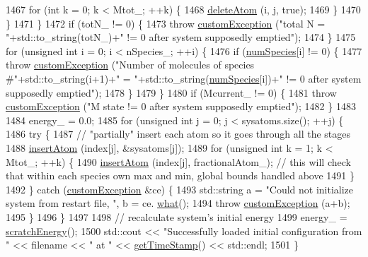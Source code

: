 \begin{DoxyCode}
1467             \textcolor{keywordflow}{for} (\textcolor{keywordtype}{int} k = 0; k < Mtot\_; ++k) \{
1468                 \hyperlink{classsim_system_acabf4fc5b5b90bba62e1449ddb3646c6}{deleteAtom} (i, j, \textcolor{keyword}{true});
1469             \}
1470         \}
1471     \}
1472     \textcolor{keywordflow}{if} (totN\_ != 0) \{
1473         \textcolor{keywordflow}{throw} \hyperlink{classcustom_exception}{customException} (\textcolor{stringliteral}{"total N = "}+std::to\_string(totN\_)+\textcolor{stringliteral}{" != 0 after system
       supposedly emptied"});
1474     \}
1475     \textcolor{keywordflow}{for} (\textcolor{keywordtype}{unsigned} \textcolor{keywordtype}{int} i = 0; i < nSpecies\_; ++i) \{
1476         \textcolor{keywordflow}{if} (\hyperlink{classsim_system_a9eea865e6dc1cff377b1e79c4d9c23f0}{numSpecies}[i] != 0) \{
1477             \textcolor{keywordflow}{throw} \hyperlink{classcustom_exception}{customException} (\textcolor{stringliteral}{"Number of molecules of species #"}+std::to\_string(i+1)+\textcolor{stringliteral}{"
       = "}+std::to\_string(\hyperlink{classsim_system_a9eea865e6dc1cff377b1e79c4d9c23f0}{numSpecies}[i])+\textcolor{stringliteral}{" != 0 after system supposedly emptied"});
1478         \}
1479     \}
1480     \textcolor{keywordflow}{if} (Mcurrent\_ != 0) \{
1481         \textcolor{keywordflow}{throw} \hyperlink{classcustom_exception}{customException} (\textcolor{stringliteral}{"M state != 0 after system supposedly emptied"});
1482     \}
1483 
1484     energy\_ = 0.0;
1485     \textcolor{keywordflow}{for} (\textcolor{keywordtype}{unsigned} \textcolor{keywordtype}{int} j = 0; j < sysatoms.size(); ++j) \{
1486         \textcolor{keywordflow}{try} \{
1487             \textcolor{comment}{// "partially" insert each atom so it goes through all the stages}
1488             \hyperlink{classsim_system_a0404e9435cc046d19b6bb990678ee069}{insertAtom} (index[j], &sysatoms[j]);
1489             \textcolor{keywordflow}{for} (\textcolor{keywordtype}{unsigned} \textcolor{keywordtype}{int} k = 1; k < Mtot\_; ++k) \{
1490                 \hyperlink{classsim_system_a0404e9435cc046d19b6bb990678ee069}{insertAtom} (index[j], fractionalAtom\_); \textcolor{comment}{// this will check that within each
       species own max and min, global bounds handled above}
1491             \}
1492         \} \textcolor{keywordflow}{catch} (\hyperlink{classcustom_exception}{customException} &ce) \{
1493             std::string a = \textcolor{stringliteral}{"Could not initialize system from restart file, "}, b = ce.
      \hyperlink{classcustom_exception_aeb6ab5848b038adfc68fde86a512f691}{what}();
1494             \textcolor{keywordflow}{throw} \hyperlink{classcustom_exception}{customException} (a+b);
1495         \}
1496     \}
1497 
1498     \textcolor{comment}{// recalculate system's initial energy}
1499     energy\_ = \hyperlink{classsim_system_a51539ed4c3bb4905b32ce428c1c537fe}{scratchEnergy}();
1500     std::cout << \textcolor{stringliteral}{"Successfully loaded initial configuration from "} << filename << \textcolor{stringliteral}{" at "} << 
      \hyperlink{utilities_8cpp_aa6d910bf51f18a75deb20c6f0fbba285}{getTimeStamp}() << std::endl;
1501 \}
\end{DoxyCode}
